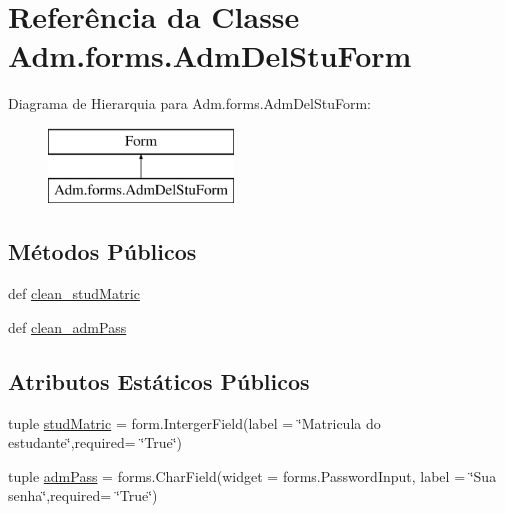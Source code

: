 \hypertarget{classAdm_1_1forms_1_1AdmDelStuForm}{\section{Referência da Classe Adm.\-forms.\-Adm\-Del\-Stu\-Form}
\label{classAdm_1_1forms_1_1AdmDelStuForm}
}
Diagrama de Hierarquia para Adm.\-forms.\-Adm\-Del\-Stu\-Form\-:\begin{figure}[H]
\begin{center}
\leavevmode
\includegraphics[height=2.000000cm]{db/db9/classAdm_1_1forms_1_1AdmDelStuForm}
\end{center}
\end{figure}
\subsection*{Métodos Públicos}
\begin{DoxyCompactItemize}
\item 
def \hyperlink{classAdm_1_1forms_1_1AdmDelStuForm_ad50237848b6ed6ec4d8f8b943549fa37}{clean\-\_\-stud\-Matric}
\item 
def \hyperlink{classAdm_1_1forms_1_1AdmDelStuForm_a7da16ff5ed24848a59a7256bf30ca62c}{clean\-\_\-adm\-Pass}
\end{DoxyCompactItemize}
\subsection*{Atributos Estáticos Públicos}
\begin{DoxyCompactItemize}
\item 
tuple \hyperlink{classAdm_1_1forms_1_1AdmDelStuForm_a9ab40744579cf679da8a3a922a29061c}{stud\-Matric} = form.\-Interger\-Field(label = \char`\"{}Matricula do estudante\char`\"{},required= \char`\"{}True\char`\"{})
\item 
tuple \hyperlink{classAdm_1_1forms_1_1AdmDelStuForm_aff2b1076da947f2f4415f985bdc46d18}{adm\-Pass} = forms.\-Char\-Field(widget = forms.\-Password\-Input, label = \char`\"{}Sua senha\char`\"{},required= \char`\"{}True\char`\"{})
\end{DoxyCompactItemize}


